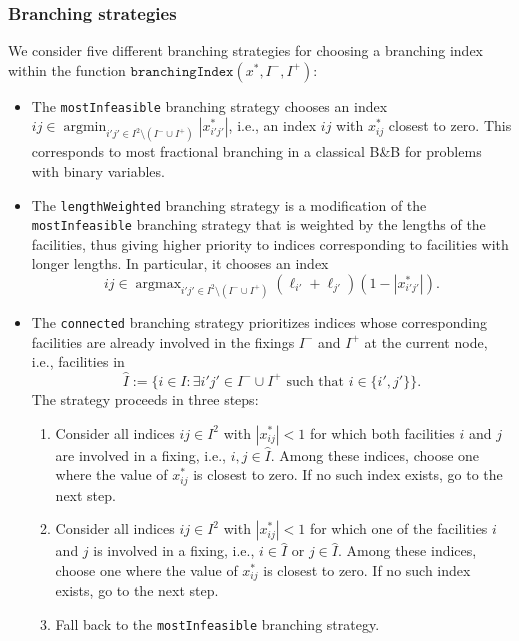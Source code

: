 \documentclass{article}
\newcommand{\BB}{B\&B\xspace}
\DeclareMathOperator*{\argmin}{arg min}
\DeclareMathOperator*{\argmax}{arg max}
\begin{document}
\subsubsection{Branching strategies}\label{sec:binStrat}
 We consider five different branching strategies for choosing a branching index within the function $\texttt{branchingIndex}(x^*,I^-,I^+)$:
\begin{itemize}
    \item The \texttt{mostInfeasible} branching strategy chooses an index $ij \in \argmin_{i'j'\in I^2 \setminus (I^- \cup I^+)} |x^*_{i'j'}|$, i.e., an index $ij$ with $x^*_{ij}$ closest to zero. 
    This corresponds to most fractional branching in a classical \BB for problems with binary variables.

    \item The \texttt{lengthWeighted} branching strategy is a modification of the \texttt{mostInfeasible} branching strategy that is weighted by the lengths of the facilities, thus giving higher priority to indices corresponding to facilities with longer lengths. 
    In particular, it chooses an index
    \[
        ij \in \argmax_{i'j' \in I^2 \setminus (I^- \cup I^+)} (\ell_{i'} + \ell_{j'}) (1-|x^*_{i'j'}|).
    \]

    \item The \texttt{connected} branching strategy prioritizes indices whose corresponding facilities are already involved in the fixings $I^-$ and $I^+$ at the current node, i.e., facilities in 
    \[
        \hat{I}:=\{i \in I: \exists i'j' \in I^-\cup I^+ \text{ such that } i \in \{i',j'\}\}.
    \]
    The strategy proceeds in three steps:
    \begin{enumerate}
        \item Consider all indices $ij \in I^2$ with $|x^*_{ij}|<1$ for which both facilities $i$ and $j$ are involved in a fixing, i.e., $i,j \in \hat{I}$. Among these indices, choose one where the value of $x^*_{ij}$ is closest to zero. If no such index exists, go to the next step.
        \item Consider all indices $ij \in I^2$ with $|x^*_{ij}|<1$ for which one of the facilities $i$ and $j$ is involved in a fixing, i.e., $i \in \hat{I}$ or $j \in \hat{I}$. Among these indices, choose one where the value of $x^*_{ij}$ is closest to zero. If no such index exists, go to the next step.
         \item Fall back to the \texttt{mostInfeasible} branching strategy.
    \end{enumerate}
    

\end{itemize}
\end{document}
